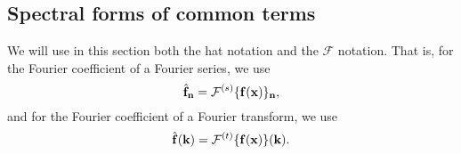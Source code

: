 \documentclass[11pt]{article}
\begin{document}
\subsection{Spectral forms of common terms}
We will use in this section both the hat notation and the $\mathcal{F}$ notation. That is, for the Fourier coefficient of a Fourier series, we use
\begin{equation*}
\hat{\mathbf{f}}_{\mathbf{n}} = \mathcal{F}^{(s)}\{ \mathbf{f}(\mathbf{x}) \}_{\mathbf{n}},
\end{equation*}
and for the Fourier coefficient of a Fourier transform, we use
\begin{equation*}
 \hat{\mathbf{f}}(\mathbf{k}) = \mathcal{F}^{(t)}\{ \mathbf{f}(\mathbf{x}) \}(\mathbf{k}).
\end{equation*}
\end{document}
